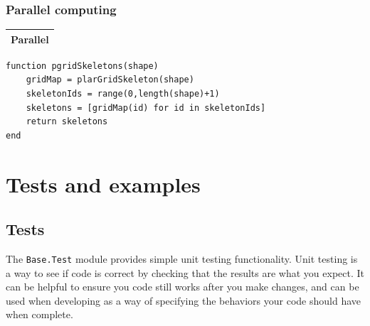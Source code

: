 \documentclass{article}
\begin{document}
\begin{flushleft}
\vspace{2ex}

\subsubsection{Parallel computing}
\vspace{1ex}
\begin{center}
\begin{tabular}{|p{16cm}|}
\hline
\cellcolor[gray]{.9}Parallel\\
\hline
\end{tabular}
\end{center}
\begin{list}{}{} \item
   \begin{Verbatim}[tabsize=4]
function pgridSkeletons(shape)
    gridMap = plarGridSkeleton(shape)
    skeletonIds = range(0,length(shape)+1)
    skeletons = [gridMap(id) for id in skeletonIds]
    return skeletons
end
   \end{Verbatim}
\end{list}

\vspace{-1ex}
\footnotesize\addtolength{\baselineskip}{-1ex}
\end{flushleft}

\section{Tests and examples}
\subsection{Tests}

The \texttt{Base.Test} module provides simple unit testing functionality. Unit testing is a way to see if code is correct by checking that the results are what you expect. It can be helpful to ensure you code still works after you make changes, and can be used when developing as a way of specifying the behaviors your code should have when complete.\citep{julia}
 
\end{document}
